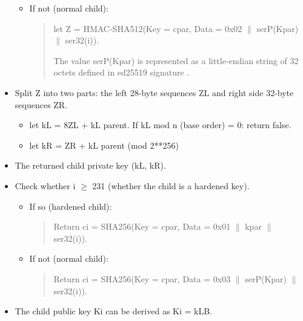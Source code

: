 \begin{adjustwidth}{0.5cm}{}
\begin{itemize}
\begin{itemize}
\begin{quote}
                        \end{quote}

                  \item If not (normal child):
                        \begin{quote}
                            let Z = HMAC-SHA512(Key = cpar, Data = 0x02 $\parallel$ serP(Kpar) $\parallel$ ser32(i)).

                            The value serP(Kpar) is represented as a little-endian string of 32 octets defined in ed25519 signature \cite{DBLP:journals/rfc/rfc8032}.

                        \end{quote}
              \end{itemize}
              \bigskip

        \item Split Z into two parts: the left 28-byte sequences ZL and right side 32-byte sequences ZR.
              \begin{itemize}
                  \item let kL = 8ZL +  kL parent. If kL mod n (base order) = 0: return false.

                  \item let  kR = ZR +  kL parent (mod 2**256)

              \end{itemize}
              \bigskip

        \item The returned child private key (kL, kR).

              \bigskip
        \item Check whether i $\geq$ 231 (whether the child is a hardened key).
              \begin{itemize}
                  \item If so (hardened child):
                        \begin{quote}
                            Return ci = SHA256(Key = cpar, Data = 0x01 $\parallel$ kpar $\parallel$ ser32(i)).
                        \end{quote}
                  \item If not (normal child):
                        \begin{quote}
                            Return ci = SHA256(Key = cpar, Data = 0x03 $\parallel$ serP(Kpar) $\parallel$ ser32(i)).
                        \end{quote}
              \end{itemize}
              \bigskip
        \item The child public key Ki can be derived as Ki = kLB.


\end{itemize}
\end{adjustwidth}
